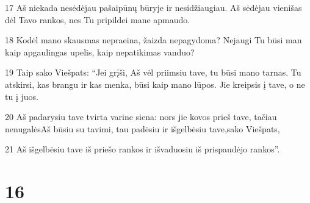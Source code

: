 \par 17 Aš niekada nesėdėjau pašaipūnų būryje ir nesidžiaugiau. Aš sėdėjau vienišas dėl Tavo rankos, nes Tu pripildei mane apmaudo. 
\par 18 Kodėl mano skausmas nepraeina, žaizda nepagydoma? Nejaugi Tu būsi man kaip apgaulingas upelis, kaip nepatikimas vanduo? 
\par 19 Taip sako Viešpats: “Jei grįši, Aš vėl priimsiu tave, tu būsi mano tarnas. Tu atskirsi, kas brangu ir kas menka, būsi kaip mano lūpos. Jie kreipsis į tave, o ne tu į juos. 
\par 20 Aš padarysiu tave tvirta varine siena: nors jie kovos prieš tave, tačiau nenugalės­Aš būsiu su tavimi, tau padėsiu ir išgelbėsiu tave,­sako Viešpats,­ 
\par 21 Aš išgelbėsiu tave iš priešo rankos ir išvaduosiu iš prispaudėjo rankos”.



\chapter{16}


